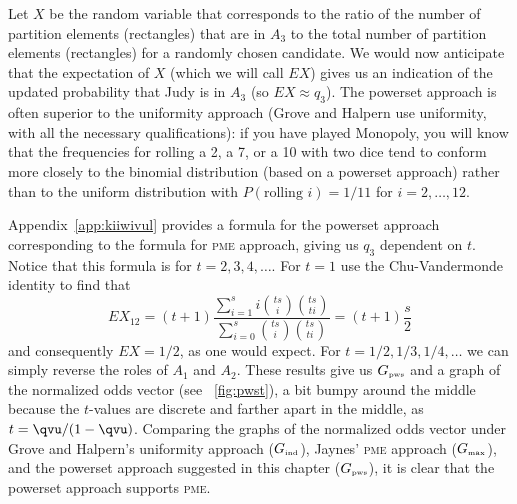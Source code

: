 \documentclass[phd,12pt,oneside]{ubcthesis}
\begin{document}
Let $X$ be the random variable that corresponds to the ratio of the
number of partition elements (rectangles) that are in $A_{3}$ to the
total number of partition elements (rectangles) for a randomly chosen
candidate. We would now anticipate that the expectation of $X$ (which
we will call $EX$) gives us an indication of the updated probability
that Judy is in $A_{3}$ (so $EX\approx{}q_{3}$). The powerset approach
is often superior to the uniformity approach (Grove and Halpern use
uniformity, with all the necessary qualifications): if you have played
Monopoly, you will know that the frequencies for rolling a 2, a 7, or
a 10 with two dice tend to conform more closely to the binomial
distribution (based on a powerset approach) rather than to the uniform
distribution with $P(\mbox{rolling }i)=1/11$ for $i=2,{\ldots},12$.

Appendix~\ref{app:kiiwivul} provides a formula for the powerset
approach corresponding to the formula for \textsc{pme} approach,
giving us $q_{3}$ dependent on $t$. Notice that this formula is for
$t=2,3,4,\ldots$. For $t=1$ use the Chu-Vandermonde identity to find
that
\begin{equation}
  EX_{12}=(t+1)\frac{\sum_{i=1}^{s}i\binom{ts}{i}\binom{ts}{ti}}{\sum_{i=0}^{s}\binom{ts}{i}\binom{ts}{ti}}=(t+1)\frac{s}{2}  
\end{equation}
and consequently $EX=1/2$, as one would expect. For
$t=1/2,1/3,1/4,\ldots$ we can simply reverse the roles of $A_{1}$ and
$A_{2}$. These results give us $G_{\mbox{\tiny pws}}$ and a graph of
the normalized odds vector (see {\igure}~\ref{fig:pwst}), a bit bumpy
around the middle because the $t$-values are discrete and farther
apart in the middle, as $t={\qvu}/(1-{\qvu})$. Comparing the graphs of
the normalized odds vector under Grove and Halpern's uniformity
approach ($G_{\mbox{\tiny ind}}$), Jaynes' \textsc{pme} approach
($G_{\mbox{\tiny max}}$), and the powerset approach suggested in this
chapter ($G_{\mbox{\tiny pws}}$), it is clear that the powerset approach
supports \textsc{pme}.
\end{document}
